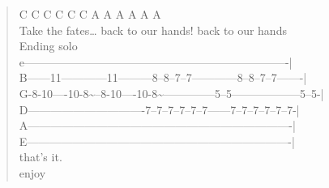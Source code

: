 \documentclass[11pt]{article}
\begin{document}
\begin{verse}
C C C     C C  C   A A A             A A A\\
Take the fates\ldots{} back to our hands! back to our hands\\
\vspace*{1em}
Ending solo\\
e----------------------------------------------------------------------|\\
B------11------------11---------8--8--7--7------------8--8--7--7-------|\\
G-8-10----10-8\textasciitilde{}--8-10----10-8\textasciitilde{}--------------5--5------------------5--5-|\\
D-------------------------------7--7--7--7--7--7------7--7--7--7--7--7-|\\
A----------------------------------------------------------------------|\\
E----------------------------------------------------------------------|\\
\vspace*{1em}
that's it.\\
\vspace*{1em}
enjoy\\
\end{verse}
\clearpage
\end{document}
